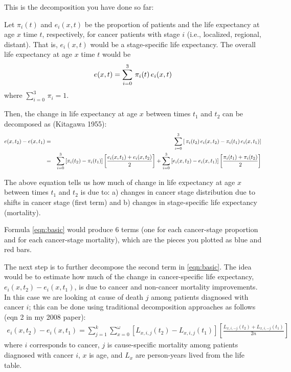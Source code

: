 \documentclass[twoside]{article}
\begin{document}
This is the decomposition you have done so far:

Let $\pi_i(t)$ and $e_i(x,t)$ be the proportion of patients and the life expectancy at age $x$ time $t$, 
respectively, for cancer patients with stage $i$ (i.e., localized, regional, distant). That is, 
$e_i(x,t)$ would be a stage-specific life expectancy. The overall life expectancy at age $x$ time $t$ would be
\begin{eqnarray}
  e(x,t)=\sum_{i=0}^{3}\,\pi_i(t)\,e_i(x,t) \notag
\end{eqnarray}
where $\sum_{i=0}^{3}\,\pi_i=1$.

Then, the change in life expectancy at age $x$ between times $t_1$ and $t_2$ can be decomposed as (Kitagawa 1955):
{\footnotesize
\begin{eqnarray}
  e(x,t_2)-e(x,t_1)&=&\sum_{i=0}^{3}\left[\,\pi_i(t_2)\,e_i(x,t_2)- \pi_i(t_1)\,e_i(x,t_1)\right] \notag \\
  &=&\sum_{i=0}^{3}\left[\pi_i(t_2)-\pi_i(t_1) \right]\left[\frac{e_i(x,t_1)+e_i(x,t_2)}{2}\right]+\sum_{i=0}^{3}\left[e_i(x,t_2)-e_i(x,t_1) \right]\left[\frac{\pi_i(t_1)+\pi_i(t_2)}{2}\right] 
  \label{eqn:basic}
\end{eqnarray}
}

The above equation tells us how much of change in life expectancy at age $x$ between times $t_1$ and $t_2$ is due to: 
a) changes in cancer stage distribution due to shifts in cancer stage (first term) and b) changes in stage-specific life expectancy (mortality).

Formula \eqref{eqn:basic} would produce 6 terms (one for each cancer-stage proportion and for each cancer-stage mortality), which
are the pieces you plotted as blue and red bars. 

The next step is to further decompose the second term in \eqref{eqn:basic}. The idea would be to estimate how much of the change
in cancer-specific life expectancy, $e_i(x,t_2)-e_i(x,t_1)$, is due to cancer and non-cancer mortality improvements. 
In this case we are looking at cause of death $j$ among patients diagnosed with cancer $i$; this can be done using traditional decomposition approaches as follows (eqn 2 in my 2008 paper):
\begin{eqnarray}
e_i(x,t_2)-e_i(x,t_1)=\sum_{j=1}^{k} \sum_{x=0}^{\omega}\left[L_{x,i,j}(t_2)-L_{x,i,j}(t_1) \right] \left[\frac{L_{x,i,-j}(t_2)+L_{x,i,-j}(t_1) }{2n} \right]
\label{eqn:causedecomp}
\end{eqnarray}
where $i$ corresponds to cancer, $j$ is cause-specific mortality among patients diagnosed with cancer $i$, $x$ is age, and $L_x$ are person-years lived from the life table.
\end{document}

